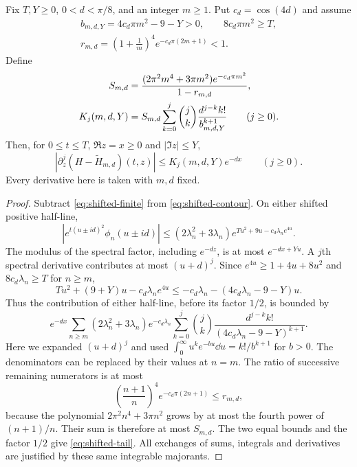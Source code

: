 \begin{theorem}\label{thm:shifted-tail}
Fix $T,Y\ge0$, $0<d<\pi/8$, and an integer $m\ge1$. Put
$c_d=\cos(4d)$ and assume
\begin{equation}\label{eq:shifted-admissible}
 \begin{gathered}
 b_{m,d,Y}=4c_d\pi m^2-9-Y>0,\qquad 8c_d\pi m^2\ge T,\\
 r_{m,d}=\left(1+\frac1m\right)^4e^{-c_d\pi(2m+1)}<1.
 \end{gathered}
\end{equation}
Define
\begin{align}
 S_{m,d}&=\frac{(2\pi^2m^4+3\pi m^2)e^{-c_d\pi m^2}}{1-r_{m,d}},
 \notag\\
 K_j(m,d,Y)&=S_{m,d}\sum_{k=0}^j\binom jk
                  \frac{d^{j-k}k!}{b_{m,d,Y}^{k+1}}
                  \qquad(j\ge0).\label{eq:shifted-K}
\end{align}
Then, for $0\le t\le T$, $\Re z=x\ge0$ and $|\Im z|\le Y$,
\begin{equation}\label{eq:shifted-tail}
 \boxed{\left|\partial_z^j
       (H-\widetilde H_{m,d})(t,z)\right|
       \le K_j(m,d,Y)e^{-dx}\qquad(j\ge0).}
\end{equation}
Every derivative here is taken with $m,d$ fixed.
\end{theorem}
\begin{proof}
Subtract \eqref{eq:shifted-finite} from
\eqref{eq:shifted-contour}. On either shifted positive half-line,
\[
 |e^{t(u\pm id)^2}\phi_n(u\pm id)|
 \le(2\lambda_n^2+3\lambda_n)
       e^{Tu^2+9u-c_d\lambda_ne^{4u}}.
\]
The modulus of the spectral factor, including $e^{-dz}$, is at most
$e^{-dx+Yu}$. A $j$th spectral derivative contributes at most $(u+d)^j$.
Since $e^{4u}\ge1+4u+8u^2$ and $8c_d\lambda_n\ge T$ for $n\ge m$,
\[
 Tu^2+(9+Y)u-c_d\lambda_ne^{4u}
 \le-c_d\lambda_n-(4c_d\lambda_n-9-Y)u.
\]
Thus the contribution of either half-line, before its factor $1/2$, is
bounded by
\[
 e^{-dx}\sum_{n\ge m}(2\lambda_n^2+3\lambda_n)e^{-c_d\lambda_n}
 \sum_{k=0}^j\binom jk
 \frac{d^{j-k}k!}{(4c_d\lambda_n-9-Y)^{k+1}}.
\]
Here we expanded $(u+d)^j$ and used
$\int_0^\infty u^ke^{-bu}\dd u=k!/b^{k+1}$ for $b>0$.
The denominators can be replaced by their values at $n=m$.
The ratio of successive remaining numerators is at most
\[
 \left(\frac{n+1}{n}\right)^4e^{-c_d\pi(2n+1)}\le r_{m,d},
\]
because the polynomial $2\pi^2n^4+3\pi n^2$ grows by at most the fourth
power of $(n+1)/n$. Their sum is therefore at most $S_{m,d}$.
The two equal bounds and the factor $1/2$ give
\eqref{eq:shifted-tail}. All exchanges of sums, integrals and derivatives
are justified by these same integrable majorants.
\end{proof}

